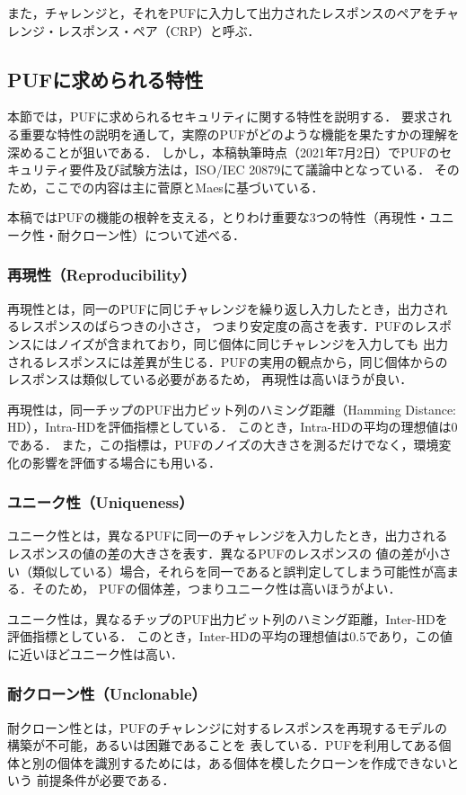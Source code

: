 \documentclass[technicalreport]{ieicej} %
\begin{document}
また，チャレンジと，それをPUFに入力して出力されたレスポンスのペアをチャレンジ・レスポンス・ペア（CRP）と呼ぶ．
\subsection{PUFに求められる特性}
本節では，PUFに求められるセキュリティに関する特性を説明する．
要求される重要な特性の説明を通して，実際のPUFがどのような機能を果たすかの理解を深めることが狙いである．
しかし，本稿執筆時点（2021年7月2日）でPUFのセキュリティ要件及び試験方法は，ISO/IEC 20879にて議論中となっている．
そのため，ここでの内容は主に菅原\cite{sugatake}とMaes\cite{maes1}に基づいている．

本稿ではPUFの機能の根幹を支える，とりわけ重要な3つの特性（再現性・ユニーク性・耐クローン性）について述べる．
\subsubsection{再現性（Reproducibility）}
再現性とは，同一のPUFに同じチャレンジを繰り返し入力したとき，出力されるレスポンスのばらつきの小ささ，
つまり安定度の高さを表す．PUFのレスポンスにはノイズが含まれており，同じ個体に同じチャレンジを入力しても
出力されるレスポンスには差異が生じる．PUFの実用の観点から，同じ個体からのレスポンスは類似している必要があるため，
再現性は高いほうが良い．

再現性は，同一チップのPUF出力ビット列のハミング距離（Hamming Distance: HD），Intra-HDを評価指標としている．
このとき，Intra-HDの平均の理想値は0である．
また，この指標は，PUFのノイズの大きさを測るだけでなく，環境変化の影響を評価する場合にも用いる．
\subsubsection{ユニーク性（Uniqueness）}
ユニーク性とは，異なるPUFに同一のチャレンジを入力したとき，出力されるレスポンスの値の差の大きさを表す．異なるPUFのレスポンスの
値の差が小さい（類似している）場合，それらを同一であると誤判定してしまう可能性が高まる．そのため，
PUFの個体差，つまりユニーク性は高いほうがよい．

ユニーク性は，異なるチップのPUF出力ビット列のハミング距離，Inter-HDを評価指標としている．
このとき，Inter-HDの平均の理想値は0.5であり，この値に近いほどユニーク性は高い．
\subsubsection{耐クローン性（Unclonable）}
耐クローン性とは，PUFのチャレンジに対するレスポンスを再現するモデルの構築が不可能，あるいは困難であることを
表している．PUFを利用してある個体と別の個体を識別するためには，ある個体を模したクローンを作成できないという
前提条件が必要である．
\end{document}
